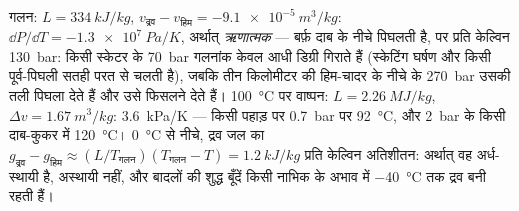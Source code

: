 \begin{example}[जल: ढालें और अर्ध-स्थायित्व]\label{ex:b2:thermodynamic-potentials:water}
गलन: $L = \qty{334}{kJ/kg}$, $v_{\text{द्रव}} - v_{\text{हिम}} = -\qty{9.1e-5}{m^3/kg}$:
$\dd P/\dd T = \qty{-1.3e7}{Pa/K}$, अर्थात् \emph{ऋणात्मक} --- बर्फ़ दाब के नीचे
पिघलती है, पर प्रति केल्विन \qty{130}{bar}: किसी स्केटर के \qty{70}{bar} गलनांक
केवल आधी डिग्री गिराते हैं (स्केटिंग घर्षण और किसी पूर्व-पिघली सतही परत से
चलती है), जबकि तीन किलोमीटर की हिम-चादर के नीचे के \qty{270}{bar} उसकी तली
पिघला देते हैं और उसे फिसलने देते हैं। \qty{100}{\celsius} पर वाष्पन:
$L = \qty{2.26}{MJ/kg}$, $\Delta v = \qty{1.67}{m^3/kg}$:
\qty{3.6}{kPa/K} --- किसी पहाड़ पर \qty{0.7}{bar} पर \qty{92}{\celsius},
और \qty{2}{bar} के किसी दाब-कुकर में \qty{120}{\celsius}।
\qty{0}{\celsius} से नीचे, द्रव जल का $g_{\text{द्रव}} - g_{\text{हिम}} \approx
(L/T_{\text{गलन}})(T_{\text{गलन}} - T) = \qty{1.2}{kJ/kg}$ प्रति केल्विन
अतिशीतन: अर्थात् वह अर्ध-स्थायी है, अस्थायी नहीं, और बादलों की शुद्ध बूँदें
किसी नाभिक के अभाव में \qty{-40}{\celsius} तक द्रव बनी रहती हैं।
\end{example}

